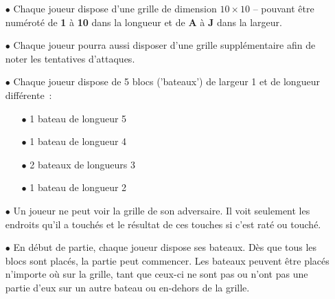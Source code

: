 \documentclass[12pt]{article}
\begin{document}
\begin{itemize}
      \item[$\bullet$] Chaque joueur dispose d'une grille de dimension $10
                  \times 10$ –
            pouvant être numéroté de \textbf{1} à \textbf{10} dans la longueur
            et de
            \textbf{A} à \textbf{J} dans la largeur.

            \bigskip

      \item[$\bullet$] Chaque joueur pourra aussi disposer d'une grille
            supplémentaire
            afin
            de noter les tentatives d'attaques.

            \bigskip

      \item[$\bullet$] Chaque joueur dispose de 5 blocs ('bateaux') de
            largeur 1
            et de
            longueur différente :
            \begin{itemize}
                  \item[$\bullet$] 1 bateau de longueur 5
                  \item[$\bullet$] 1 bateau de longueur 4
                  \item[$\bullet$] 2 bateaux de longueurs 3
                  \item[$\bullet$] 1 bateau de longueur 2
            \end{itemize}

            \bigskip

      \item[$\bullet$] Un joueur ne peut voir la grille de son adversaire. Il
            voit
            seulement les endroits qu'il a touchés et le résultat de ces
            touches si c'est
            raté ou touché.

            \bigskip

      \item[$\bullet$] En début de partie, chaque joueur dispose ses bateaux.
            Dès que tous les blocs sont placés, la partie peut commencer. Les
            bateaux
            peuvent être placés n'importe où sur la grille, tant que ceux-ci ne
            sont pas ou
            n'ont pas une partie d'eux sur un autre bateau ou en-dehors de la
            grille.

            \bigskip


\end{itemize}
\end{document}
